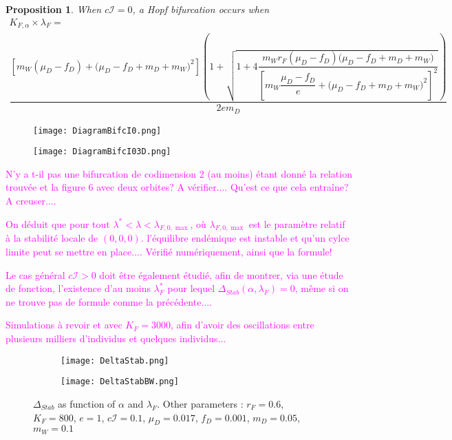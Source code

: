 \documentclass{article}
\newcommand{\lfw}{\lambda_{F}}
\newcommand{\lfw}{\lambda_{F}}
\newcommand{\Kfa}{K_{F,\alpha}}
\newcommand{\YD}[1]{\textcolor{magenta}{#1}}
\newtheorem{prop}{Proposition}
\begin{document}
\begin{prop} When $c \mathcal{I} = 0$, a Hopf bifurcation occurs when 
\begin{multline*} 
\Kfa \times \lambda_F = \\
 \dfrac{\left[m_{W}(\mu_{D}-f_{D})+\big(\mu_{D}-f_{D}+m_{D}+m_{W})^{2}\right]\left(1+\sqrt{1+4\dfrac{m_{W}r_{F}\left(\mu_{D}-f_{D}\right)\big(\mu_{D}-f_{D}+m_{D}+m_{W})}{\left[m_{W}\dfrac{\mu_{D}-f_{D}}{e}+\big(\mu_{D}-f_{D}+m_{D}+m_{W})^{2}\right]^{2}}}\right)}{2em_D}
 \end{multline*}
\end{prop}


\begin{figure}
    \centering
    \texttt{[image: DiagramBifcI0.png]}
    \caption{}
    \label{fig:my_label}
\end{figure}

\begin{figure}
    \centering
    \texttt{[image: DiagramBifcI03D.png]}
    \caption{}
    \label{fig:my_label}
\end{figure}



\YD{N'y a t-il pas une bifurcation de codimension 2 (au moins) étant donné la relation trouvée et la figure 6 avec deux orbites? A vérifier.... Qu'est ce que cela entraîne? A creuser....}

\YD{On déduit que pour tout $\lambda^*<\lambda < \lambda_{F,0,\max}$, où $\lambda_{F,0,\max}$ est le paramètre relatif à la stabilité locale de $(0,0,0)$. l'équilibre endémique est instable et qu'un cylce limite peut se mettre en place.... Vérifié numériquement, ainsi que la formule!}

\YD{Le cas général $c\mathcal{I}>0$ doit être également étudié, afin de montrer, via une étude de fonction, l'existence d'au moins $\lfw^*$ pour lequel $\Delta_{Stab}(\alpha, \lfw)=0$, même si on ne trouve pas de formule comme la précédente....}

\vspace{2cm}

\YD{Simulations à revoir et avec $K_F=3000$, afin d'avoir des oscillations entre plusieurs milliers d'individus et quelques individus...}
\begin{figure}[!ht]
\centering
\begin{subfigure}[b]{1\textwidth}
\centering
\texttt{[image: DeltaStab.png]}
\end{subfigure}
\begin{subfigure}[b]{1\textwidth}
\centering
\texttt{[image: DeltaStabBW.png]}
\end{subfigure}
\caption{\centering $\Delta_{Stab}$ as function of $\alpha$ and $\lfw$. \newline
Other parameters : $r_F = 0.6$, $K_F = 800$, $e=1$, $c\mathcal{I} = 0.1$, $\mu_D = 0.017$, $f_D = 0.001$, $m_D = 0.05$, $m_W = 0.1$}
\end{figure}
\end{document}
